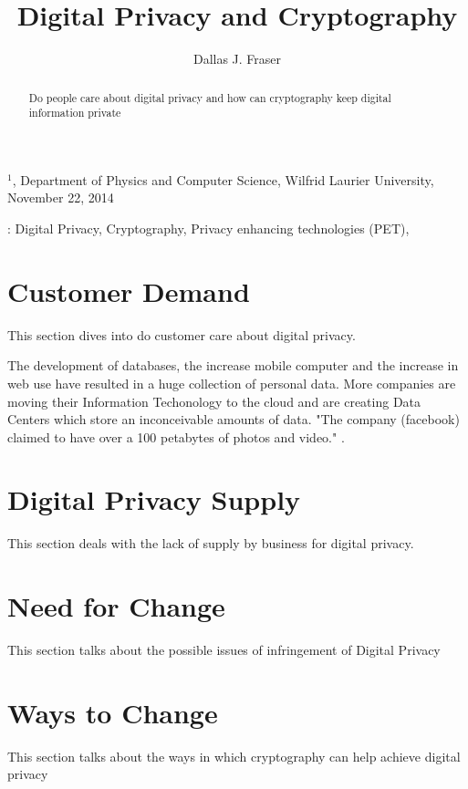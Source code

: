 \documentclass[12pt]{article}
\title{Digital Privacy and Cryptography}
\author{
	Dallas J. Fraser\inst{1}
}
\def\inst#1{$^{#1}$}
\def\sone{\cite{WallBank}}
\begin{document}
\maketitle

\begin{center}
{\footnotesize

\inst{1}, Department of Physics and Computer Science, Wilfrid Laurier 
University, November 22, 2014}

\end{center}

\begin{abstract}
Do people care about digital privacy and how can cryptography keep digital information private
\end{abstract}

: Digital Privacy, Cryptography, Privacy enhancing technologies (PET),

\section{Customer Demand}\label{sec:demand}
This section dives into do customer care about digital privacy.

The development of databases, the increase mobile computer and the increase in web use have resulted in a huge collection of personal data. More companies are moving their Information Techonology to the cloud and are creating Data Centers which store an inconceivable amounts of data. "The company (facebook) claimed to have over a 100 petabytes of photos and video." {\sone}.

\section{Digital Privacy Supply}\label{sec:supply}
This section deals with the lack of supply by business for digital privacy.


\section{Need for Change}\label{sec:change}
This section talks about the possible issues of infringement of Digital Privacy


\section{Ways to  Change}\label{sec:developers}
This section talks about the ways in which cryptography can help achieve digital privacy
\end{document}
